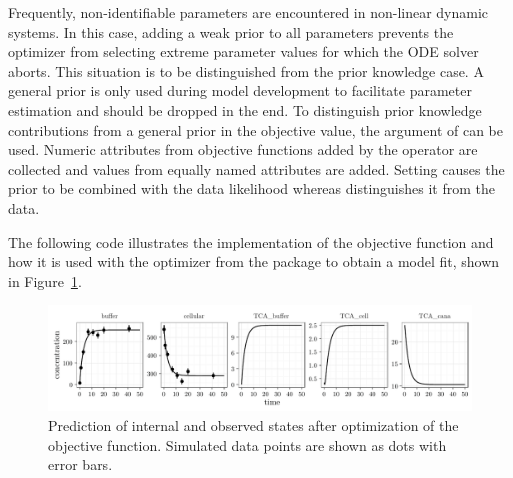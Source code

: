 \documentclass[article]{jss}
\begin{document}
Frequently, non-identifiable parameters are encountered in non-linear dynamic systems. In this case, adding a weak prior to all parameters prevents the optimizer from selecting extreme parameter values for which the ODE solver aborts. This situation is to be distinguished from the prior knowledge case. A general prior is only used during model development to facilitate parameter estimation and should be dropped in the end. To distinguish prior knowledge contributions from a general prior in the objective value, the  argument of  can be used. Numeric attributes from objective functions added by the  operator are collected and values from equally named attributes are added. Setting  causes the prior to be combined with the data likelihood whereas  distinguishes it from the data. 

The following code illustrates the implementation of the objective function and how it is used with the  optimizer from the  package \citep{trust} to obtain a model fit, shown in Figure~\ref{fig:myfit}.

\begin{CodeChunk}
\end{CodeChunk}


\begin{figure}[ht]
	\centering
	\includegraphics[width = \textwidth]{images/figure4}
	\caption{Prediction of internal and observed states after optimization of the objective function. Simulated data points are shown as dots with error bars.}
	\label{fig:myfit}
\end{figure}
\end{document}

